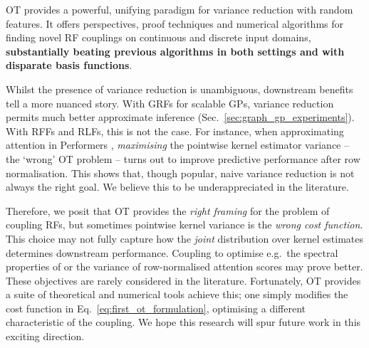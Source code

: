 \vspace{-2mm}
OT provides a powerful, unifying paradigm for variance reduction with random features.
It offers perspectives, proof techniques and numerical algorithms for finding novel RF couplings on continuous and discrete input domains, \textbf{substantially beating previous algorithms in both settings and with disparate basis functions}.

 Whilst the presence of variance reduction is unambiguous, downstream benefits tell a more nuanced story.
With GRFs for scalable GPs, variance reduction permits much better approximate inference (Sec.~\ref{sec:graph_gp_experiments}).
With RFFs and RLFs, this is not the case.
For instance, when approximating attention in Performers \citep{choromanski2020rethinking}, \emph{maximising} the pointwise kernel estimator  variance -- the `wrong' OT problem -- turns out to improve predictive performance after row normalisation. 
This shows that, though popular, naive variance reduction is not always the right goal.
We believe this to be underappreciated in the literature.

Therefore, we posit that OT provides the \emph{right framing} for the problem of coupling RFs, but sometimes pointwise kernel variance is the \emph{wrong cost function}.
This choice may not fully capture how the \emph{joint} distribution over kernel estimates determines downstream performance. 
Coupling to optimise e.g.~the spectral properties of  \citep{choromanski2018geometry, avron2017random} or the variance of row-normalised attention scores may prove better.
These objectives are rarely considered in the literature. %
Fortunately, OT provides a suite of theoretical and numerical tools achieve this; one simply modifies the cost function in Eq.~\ref{eq:first_ot_formulation}, optimising a different characteristic of the coupling. 
We hope this research will spur future work in this exciting direction.



